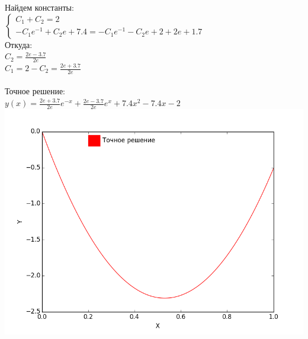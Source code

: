 \documentclass[12pt,a4paper]{article}
\begin{document}
        \noindent
        Найдем константы:\\
        $\begin{cases}
	        C_{1} + C_{2} = 2\\
    	    -C_{1}e^{-1} + C_{2}e + 7.4 = -C_{1}e^{-1} - C_{2}e + 2 + 2e + 1.7
        \end{cases}$\\
        
        \vspace{2mm}
        \noindent
        Откуда:\\
        $C_{2} = \frac{2e - 3.7}{2e}$\\
        $C_{1} = 2 - C_{2} = \frac{2e + 3.7}{2e}$\\\\
        
        \noindent
        Точное решение:\\
        $y(x) = \frac{2e + 3.7}{2e}e^{-x} + \frac{2e - 3.7}{2e}e^{x} 
        + 7.4x^{2} - 7.4x - 2$\\
        \includegraphics[scale=0.5]{exact_solution_graph}
    
    \newpage
\end{document}
